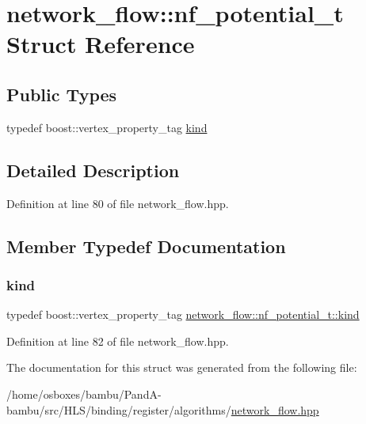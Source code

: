 \hypertarget{structnetwork__flow_1_1nf__potential__t}{}\section{network\+\_\+flow\+:\+:nf\+\_\+potential\+\_\+t Struct Reference}
\label{structnetwork__flow_1_1nf__potential__t}
\subsection*{Public Types}
\begin{DoxyCompactItemize}
\item 
typedef boost\+::vertex\+\_\+property\+\_\+tag \hyperlink{structnetwork__flow_1_1nf__potential__t_ae4959d5f04e423a5cbbbe805a63cc431}{kind}
\end{DoxyCompactItemize}


\subsection{Detailed Description}


Definition at line 80 of file network\+\_\+flow.\+hpp.



\subsection{Member Typedef Documentation}
\mbox{\label{structnetwork__flow_1_1nf__potential__t_ae4959d5f04e423a5cbbbe805a63cc431}} 
\subsubsection{\texorpdfstring{kind}{kind}}
{\footnotesize\ttfamily typedef boost\+::vertex\+\_\+property\+\_\+tag \hyperlink{structnetwork__flow_1_1nf__potential__t_ae4959d5f04e423a5cbbbe805a63cc431}{network\+\_\+flow\+::nf\+\_\+potential\+\_\+t\+::kind}}



Definition at line 82 of file network\+\_\+flow.\+hpp.



The documentation for this struct was generated from the following file\+:\begin{DoxyCompactItemize}
\item 
/home/osboxes/bambu/\+Pand\+A-\/bambu/src/\+H\+L\+S/binding/register/algorithms/\hyperlink{network__flow_8hpp}{network\+\_\+flow.\+hpp}\end{DoxyCompactItemize}
